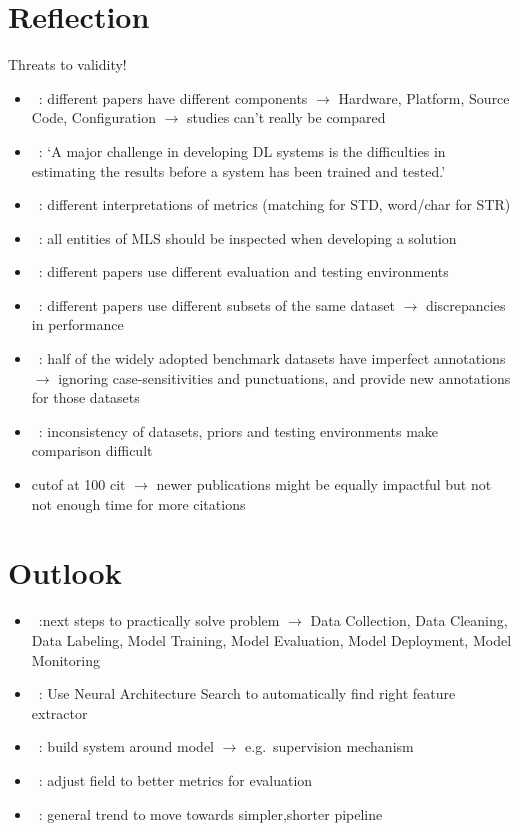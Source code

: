\section{Reflection}
Threats to validity!
\begin{itemize}
    \item~\cite{arpteg_software_2018}: different papers have different components
        $\rightarrow$ Hardware, Platform, Source Code, Configuration
        $\rightarrow$ studies can't really be compared
    \item~\cite{arpteg_software_2018}: `A major challenge in developing DL systems is the
        difficulties in estimating the results before a system has been trained and tested.'
    \item~\cite{long_scene_2021}: different interpretations of metrics (matching for \ac{STD},
        word/char for \ac{STR})
    \item~\cite{siebert_construction_2021,nakamichi_requirements-driven_2020}: all entities of
        \ac{MLS} should be inspected when developing a solution
    \item~\cite{baek_what_2019}: different papers use different evaluation and testing environments
    \item~\cite{baek_what_2019}: different papers use different subsets of the same dataset
        $\rightarrow$ discrepancies in performance
    \item~\cite{long_unrealtext_2020}: half of the widely adopted benchmark datasets have imperfect
        annotations $\rightarrow$ ignoring case-sensitivities and punctuations, and provide new
        annotations for those datasets
    \item~\cite{chen_text_2021}: inconsistency of datasets, priors and testing environments make
        comparison difficult
    \item cutof at 100 cit $\rightarrow$ newer publications might be equally impactful but not
        not enough time for more citations
\end{itemize}

\section{Outlook}

\begin{itemize}
    \item~\cite{watanabe_preliminary_2019}:next steps to practically solve problem
        $\rightarrow$  Data Collection, Data Cleaning, Data Labeling, Model Training,
        Model Evaluation, Model Deployment, Model Monitoring
    \item~\cite{zhao_improving_2020}: Use Neural Architecture Search to automatically find right
        feature extractor
    \item~\cite{siebert_construction_2021,nakamichi_requirements-driven_2020}: build system around
        model $\rightarrow$ e.g.\ supervision mechanism
    \item~\cite{shi_icdar2017_2017,he_icpr2018_2018}: adjust field to better metrics for evaluation
    \item~\cite{long_scene_2021}: general trend to move towards simpler,shorter pipeline
\end{itemize}

